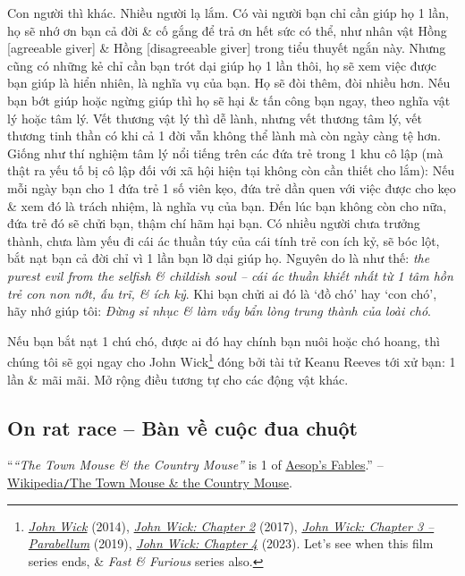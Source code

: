 \documentclass[12pt,oneside]{book}
\begin{document}
Con người thì khác. Nhiều người lạ lắm. Có vài người bạn chỉ cần giúp họ 1 lần, họ sẽ nhớ ơn bạn cả đời \& cố gắng để trả ơn hết sức có thể, như nhân vật {\sf Hồng [agreeable giver]} \& {\sf Hồng [disagreeable giver]} trong tiểu thuyết ngắn này. Nhưng cũng có những kẻ chỉ cần bạn trót dại giúp họ 1 lần thôi, họ sẽ xem việc được bạn giúp là hiển nhiên, là nghĩa vụ của bạn. Họ sẽ đòi thêm, đòi nhiều hơn. Nếu bạn bớt giúp hoặc ngừng giúp thì họ sẽ hại \& tấn công bạn ngay, theo nghĩa vật lý hoặc tâm lý. Vết thương vật lý thì dễ lành, nhưng vết thương tâm lý, vết thương tinh thần có khi cả 1 đời vẫn không thể lành mà còn ngày càng tệ hơn. Giống như thí nghiệm tâm lý nổi tiếng trên các đứa trẻ trong 1 khu cô lập (mà thật ra yếu tố bị cô lập đối với xã hội hiện tại không còn cần thiết cho lắm): Nếu mỗi ngày bạn cho 1 đứa trẻ 1 số viên kẹo, đứa trẻ dần quen với việc được cho kẹo \& xem đó là trách nhiệm, là nghĩa vụ của bạn. Đến lúc bạn không còn cho nữa, đứa trẻ đó sẽ chửi bạn, thậm chí hãm hại bạn. Có nhiều người chưa trưởng thành, chưa làm yếu đi cái ác thuần túy của cái tính trẻ con ích kỷ, sẽ bóc lột, bắt nạt bạn cả đời chỉ vì 1 lần bạn lỡ dại giúp họ. Nguyên do là như thế: {\it the purest evil from the selfish \& childish soul -- cái ác thuần khiết nhất từ 1 tâm hồn trẻ con non nớt, ấu trĩ, \& ích kỷ}. Khi bạn chửi ai đó là `đồ chó' hay `con chó', hãy nhớ giúp tôi: {\it Đừng sỉ nhục \& làm vấy bẩn lòng trung thành của loài chó}.

Nếu bạn bắt nạt 1 chú chó, được ai đó hay chính bạn nuôi hoặc chó hoang, thì chúng tôi sẽ gọi ngay cho {\sf John Wick}\footnote{\href{https://www.imdb.com/title/tt2911666}{\it John Wick} (2014), \href{https://www.imdb.com/title/tt4425200}{\it John Wick: Chapter 2} (2017), \href{https://www.imdb.com/title/tt6146586}{\it John Wick: Chapter 3 -- Parabellum} (2019), \href{https://www.imdb.com/title/tt10366206}{\it John Wick: Chapter 4} (2023). Let's see when this film series ends, \& {\it Fast \& Furious} series also.} đóng bởi tài tử {\sc Keanu Reeves} tới xử bạn: 1 lần \& mãi mãi. Mở rộng điều tương tự cho các động vật khác.

\subsection{On rat race -- Bàn về cuộc đua chuột}

``{\it``The Town Mouse \& the Country Mouse''} is 1 of \href{https://en.wikipedia.org/wiki/Aesop%27s_Fables}{Aesop's Fables}.'' -- \href{https://en.wikipedia.org/wiki/The_Town_Mouse_and_the_Country_Mouse}{Wikipedia{\tt/}The Town Mouse \& the Country Mouse}.
\end{document}
